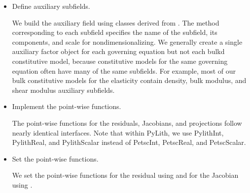 \begin{itemize}
\item Define auxiliary subfields.

  We build the auxiliary field using classes derived from
  . The method
  corresponding to each subfield specifies the name of the subfield,
  its components, and scale for nondimensionalizing. We generally
  create a single auxiliary factor object for each governing equation
  but not each bulkd constitutive model, because constitutive models
  for the same governing equation often have many of the same
  subfields. For example, most of our bulk constitutive models for the
  elasticity contain density, bulk modulus, and shear modulus
  auxiliary subfields.


\item Implement the point-wise functions.

  The point-wise functions for the residuals, Jacobians, and
  projections follow nearly identical interfaces. Note that within
  PyLith, we use PylithInt, PylithReal, and PylithScalar instead of
  PetscInt, PetscReal, and PetscScalar.

\item Set the point-wise functions.

  We set the point-wise functions for the residual using
   and for the Jacobian using
  .

\end{itemize}

